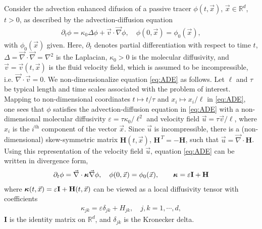 \documentclass[11pt]{amsart}
\newcommand{\Hb}{\mathbf{H}}
\newcommand{\Ib}{\mathbf{I}}
\newcommand\bkappa{\mbox{\boldmath${\kappa}$}}
\begin{document}
Consider the advection enhanced difusion of a passive tracer
$\phi(t,\vec{x})$, $\vec{x}\in\mathbb{R}^d$, $t>0$, as described by the
advection-diffusion equation 
%
\begin{align}\label{eq:ADE}
  \partial_t\phi=\kappa_0\Delta \phi+\vec{v}\cdot\vec{\nabla}\phi, \quad
  \phi(0,\vec{x})=\phi_0(\vec{x}),
\end{align}
%
with $\phi_0(\vec{x})$ given. Here, $\partial_t$ denotes partial differentiation
with respect to time $t$, $\Delta=\vec{\nabla}\cdot\vec{\nabla}=\nabla^2$ is the Laplacian,
$\kappa_0>0$ is the molecular diffusivity, and $\vec{v}=\vec{v}(t,\vec{x})$
is the fluid velocity field, which is assumed to be incompressible,
i.e. $\vec{\nabla}\cdot\vec{v}=0$. We non-dimensionalize equation
\eqref{eq:ADE} as follows. Let $\ell$ and $\tau$ be typical length and time 
scales associated with the problem of interest. Mapping to
non-dimensional coordinates $t\mapsto t/\tau$ and $x_i\mapsto x_i/\ell$ in
\eqref{eq:ADE}, one sees that $\phi$ satisfies the advection-diffusion
equation in \eqref{eq:ADE} with a non-dimensional molecular
diffusivity $\varepsilon=\tau\kappa_0/\ell^2$ and velocity field $\vec{u}=\tau\vec{v}/\ell$,
where $x_i$ is the $i^{\text{th}}$ component of the vector
$\vec{x}$. Since $\vec{u}$ is incompressible, there is a
(non-dimensional) skew-symmetric matrix $\Hb(t,\vec{x})$,
$\Hb^{\,T}=-\Hb$, such that $\vec{u}=\vec{\nabla}\cdot\Hb$. 
Using this representation of the velocity field $\vec{u}$, equation
\eqref{eq:ADE} can be written in divergence form, 
%
\begin{align}\label{eq:ADE_Divergence}
  \partial_t\phi%
    =\vec{\nabla}\cdot\bkappa\vec{\nabla}\phi, \quad
    \phi(0,\vec{x})=\phi_0(\vec{x}),
    \qquad
    \bkappa=\varepsilon\Ib+\Hb
\end{align}
%
where $\bkappa(t,\vec{x})=\varepsilon\Ib+\Hb(t,\vec{x})$ can be viewed as a local
diffusivity tensor with coefficients
%
\begin{align}\label{eq:kappa_coeff}
  \kappa_{jk}=\varepsilon\delta_{jk}+H_{jk},\quad j,k=1,\cdots,d,
\end{align}
%
$\Ib$ is the identity matrix on $\mathbb{R}^d$, and $\delta_{jk}$ is 
the Kronecker delta. 
\end{document}
